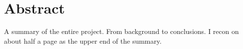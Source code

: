 
\chapter{Abstract}

A summary of the entire project.
From background to conclusions.
I recon on about half a page as the upper end of the summary.
